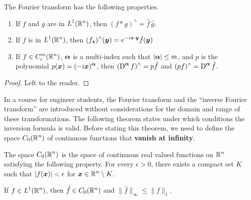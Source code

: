 
The Fourier transform has the following properties.

\begin{prop} \label{FTLofPs}
\begin{enumerate}
\item If $f$ and $g$ are in $\displaystyle L^1(\mathbb{R}^n)$, then
$\displaystyle (f\ast g)^\wedge = \hat{f}\,\hat{g}$.
\item If $f$ is in $\displaystyle L^1(\mathbb{R}^n)$, then
$\displaystyle (f_{{\bm{z}}})^\wedge({\bm{y}}) =
e^{-i {\bm{z}}\cdot{\bm{y}}} \hat{f}({\bm{y}})$
\item If $\displaystyle f \in C_c^m(\mathbb{R}^n)$, ${\bm{\alpha}}$ is a multi-index
such that $|{\bm{\alpha}}|\leq m$, and $p$ is the polynomial
$\displaystyle p({\bm{x}}) = (-i{\bm{x}})^{{\bm{\alpha}}}$,
then $\displaystyle (\operatorname{D}^{{\bm{\alpha}}} f)^\wedge = p \hat{f}$ and
$\displaystyle (p f)^\wedge = \operatorname{D}^{{\bm{\alpha}}}\hat{f}$.
\end{enumerate}
\end{prop}

\begin{proof}
Left to the reader.
\end{proof}

In a course for engineer students, the Fourier transform and the
``inverse Fourier transform'' are introduced without considerations
for the domain and range of these transformations.  The following
theorem states under which conditions the inversion formula is valid.
Before stating this theorem, we need to define the space
$\displaystyle C_0(\mathbb{R}^n)$ of continuous functions that
{\bfseries vanish at infinity}.

The space $\displaystyle C_0(\mathbb{R}^n)$ is the space of continuous real valued
functions on $\displaystyle \mathbb{R}^n$ satisfying the following property.  For every
$\epsilon >0$, there exists a compact set $K$ such that
$|f({\bm{x}})|<\epsilon$ for $\displaystyle {\bm{x}} \in \mathbb{R}^n \setminus K$.

\begin{prop} \label{distr_C0_four_transf}
If $\displaystyle f\in L^1(\mathbb{R}^n)$, then $\hat{f} \in C_0(\mathbb{R}^n)$ and
$\|\hat{f}\|_\infty \leq \|f\|_1$.
\end{prop}

